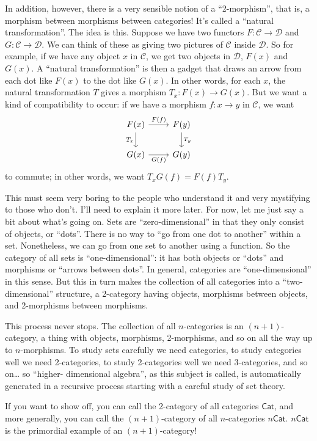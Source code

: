 \documentclass{article}
\begin{document}
In addition, however, there is a very sensible notion of a
``2-morphism'', that is, a morphism between morphisms between
categories! It's called a ``natural transformation''. The idea is this.
Suppose we have two functors \(F\colon \mathcal{C} \to \mathcal{D}\) and
\(G\colon \mathcal{C} \to \mathcal{D}\). We can think of these as giving
two pictures of \(\mathcal{C}\) inside \(\mathcal{D}\). So for example,
if we have any object \(x\) in \(\mathcal{C}\), we get two objects in
\(\mathcal{D}\), \(F(x)\) and \(G(x)\). A ``natural transformation'' is
then a gadget that draws an arrow from each dot like \(F(x)\) to the dot
like \(G(x)\). In other words, for each \(x\), the natural
transformation \(T\) gives a morphism \(T_x\colon F(x) \to G(x)\). But
we want a kind of compatibility to occur: if we have a morphism
\(f\colon x \to y\) in \(\mathcal{C}\), we want \[
  \begin{tikzcd}
    F(x) \rar["F(f)"] \dar[swap,"T_x"]
    & F(y) \dar["T_y"]
  \\G(x) \rar[swap,"G(f)"]
    & G(y)
  \end{tikzcd}
\] to commute; in other words, we want \(T_x G(f) = F(f) T_y\).

This must seem very boring to the people who understand it and very
mystifying to those who don't. I'll need to explain it more later. For
now, let me just say a bit about what's going on. Sets are
``zero-dimensional'' in that they only consist of objects, or ``dots''.
There is no way to ``go from one dot to another'' within a set.
Nonetheless, we can go from one set to another using a function. So the
category of all sets is ``one-dimensional'': it has both objects or
``dots'' and morphisms or ``arrows between dots''. In general,
categories are ``one-dimensional'' in this sense. But this in turn makes
the collection of all categories into a ``two-dimensional'' structure, a
2-category having objects, morphisms between objects, and 2-morphisms
between morphisms.

This process never stops. The collection of all \(n\)-categories is an
\((n+1)\)-category, a thing with objects, morphisms, 2-morphisms, and so
on all the way up to \(n\)-morphisms. To study sets carefully we need
categories, to study categories well we need 2-categories, to study
2-categories well we need 3-categories, and so on\ldots{} so ``higher-
dimensional algebra'', as this subject is called, is automatically
generated in a recursive process starting with a careful study of set
theory.

If you want to show off, you can call the 2-category of all categories
\(\mathsf{Cat}\), and more generally, you can call the
\((n+1)\)-category of all \(n\)-categories \(n\mathsf{Cat}\).
\(n\mathsf{Cat}\) is the primordial example of an \((n+1)\)-category!
\end{document}
